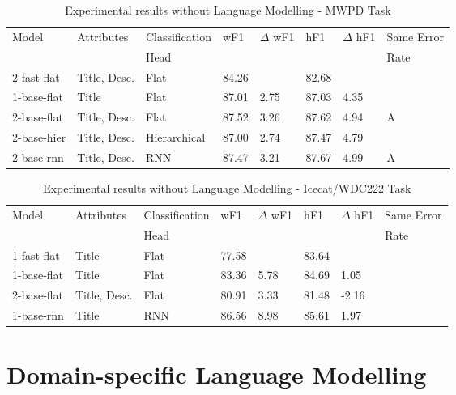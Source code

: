 \documentclass[11pt,dvipdfm]{article}
\begin{document}
\begin{table}[h]
\centering  
\begin{tabular}{@{}llllllll@{}}

Model           & Attributes         & Classification & wF1   & $\Delta$ wF1 & hF1   & $\Delta$ hF1 & Same Error\\ 
                    &                    & Head           &       &       &       &  & Rate\\ \hline
2-fast-flat & Title, Desc.                & Flat            & 84.26 &       & 82.68 & &       \\
1-base-flat         & Title              & Flat           & 87.01 & 2.75  & 87.03 & 4.35  & \\
2-base-flat         & Title, Desc. & Flat           & 87.52 & 3.26  & 87.62 & 4.94  & A\\
2-base-hier    & Title, Desc. & Hierarchical  & 87.00    & 2.74  & 87.47 & 4.79 & \\
2-base-rnn  & Title, Desc. & RNN            & 87.47 & 3.21  & 87.67 & 4.99 & A \\ \hline
\end{tabular}
\caption{Experimental results without Language Modelling - MWPD Task}
\label{tab:MWPD}
\end{table}

\begin{table}[h]
  \centering
\begin{tabular}{@{}llllllll@{}}
Model           & Attributes         & Classification & wF1   & $\Delta$ wF1 & hF1   & $\Delta$ hF1 & Same Error  \\ 
                    &                    & Head           &       &       &       &  & Rate\\ \hline
1-fast-flat & Title              & Flat           & 77.58 &       & 83.64 &  &    \\
1-base-flat         & Title              & Flat           & 83.36 & 5.78  & 84.69 & 1.05 & \\
2-base-flat         & Title, Desc. & Flat           & 80.91 & 3.33  & 81.48 & -2.16 & \\
1-base-rnn          & Title & RNN            & 86.56 & 8.98  & 85.61 & 1.97 & \\ \hline
\end{tabular}
\caption{Experimental results without Language Modelling - Icecat/WDC222 Task}
\label{tab:ICECAT}
\end{table}

\section{Domain-specific Language Modelling}
\label{sec:lang_mod}
\end{document}
